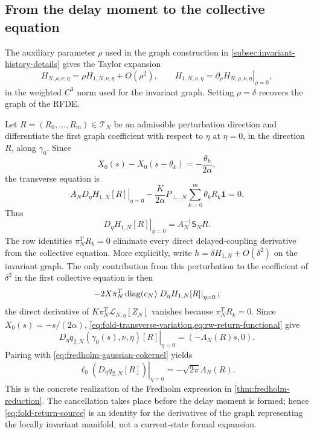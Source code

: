\subsection{From the delay moment to the collective equation}

The auxiliary parameter \(\rho\) used in the graph construction in
\cref{subsec:invariant-history-details} gives the Taylor expansion
\begin{equation}
 H_{N,\rho,\nu,\eta}
 =\rho H_{1,N,\nu,\eta}+O(\rho^2),
 \qquad
 H_{1,N,\nu,\eta}
 =\left.\partial_\rho H_{N,\rho,\nu,\eta}\right|_{\rho=0},
 \label{eq:fold-first-graph-coefficient}
\end{equation}
in the weighted \(C^3\) norm used for the invariant graph.  Setting
\(\rho=\delta\) recovers the graph of the RFDE.

Let \(R=(R_0,\ldots,R_m)\in\mathcal T_N\) be an admissible
perturbation direction and differentiate the
first graph coefficient with respect to \(\eta\) at \(\eta=0\), in the
direction \(R\), along \(\gamma_0\).  Since
\[
 X_0(s)-X_0(s-\theta_k)=-\frac{\theta_k}{2\alpha},
\]
the transverse equation is
\[
 A_N\left.D_\eta H_{1,N}[R]\right|_{\eta=0}
       -\frac{K}{2\alpha}P_{\perp,N}
       \sum_{k=0}^m\theta_kR_k\mathbf1=0.
\]
Thus
\begin{equation}
 \left.D_\eta H_{1,N}[R]\right|_{\eta=0}
 =A_N^{-1}\mathsf S_NR.                            \label{eq:fold-transverse-variation}
\end{equation}
The row identities \(\pi_N^TR_k=0\) eliminate every direct
delayed-coupling derivative from the collective equation.  More explicitly, write
\(h=\delta H_{1,N}+O(\delta^2)\) on the invariant graph.  The only
contribution from this perturbation to the coefficient of \(\delta^2\) in the first
collective equation is then
\begin{equation*}
 -2X\pi_N^T\operatorname{diag}(c_N)
      \left.D_\eta H_{1,N}[R]\right|_{\eta=0};
\end{equation*}
the direct derivative of
\(K\pi_N^T\mathcal L_{N,\eta}[Z_N]\) vanishes because
\(\pi_N^TR_k=0\).  Since \(X_0(s)=-s/(2\alpha)\),
\cref{eq:fold-transverse-variation,eq:rw-return-functional} give
\begin{equation}
 \left.D_\eta q_{2,N}(\gamma_0(s),\nu,\eta)[R]\right|_{\eta=0}
   =(-\Lambda_N(R)s,0).                             \label{eq:fold-return-source}
\end{equation}
Pairing with \cref{eq:fredholm-gaussian-cokernel} yields
\begin{equation}
 \left.\ell_0\!\left(D_\eta q_{2,N}[R]\right)\right|_{\eta=0}
 =-\sqrt{2\pi}\Lambda_N(R).                        \label{eq:fold-return-pairing}
\end{equation}
This is the concrete realization of the Fredholm expression in
\cref{thm:fredholm-reduction}.  The cancellation takes place
before the delay moment is formed; hence
\cref{eq:fold-return-source} is an identity for the derivatives of the graph
representing the locally invariant manifold, not a current-state formal
expansion.

